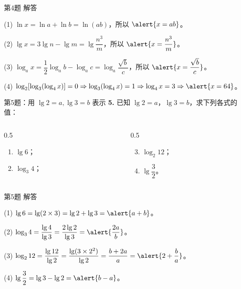 \documentclass[10pt,aspectratio=169,serif]{beamer}
\begin{document}
\begin{frame}[t]{第4题 解答}
\begin{tcolorbox}[colback=orange!10,colframe=orange,title=\textbf{解}]
(1) $\ln x = \ln a + \ln b = \ln(ab)$，所以 $\alert{x = ab}$。

(2) $\lg x = 3\lg n - \lg m = \lg\dfrac{n^3}{m}$，所以 $\alert{x = \dfrac{n^3}{m}}$。

(3) $\log_a x = \dfrac{1}{2}\log_a b - \log_a c = \log_a\dfrac{\sqrt{b}}{c}$，所以 $\alert{x = \dfrac{\sqrt{b}}{c}}$。

(4) $\log_2[\log_3(\log_4 x)] = 0 \Rightarrow \log_3(\log_4 x) = 1 \Rightarrow \log_4 x = 3 \Rightarrow \alert{x = 64}$。
\end{tcolorbox}
\end{frame}

\begin{frame}[t]{第5题：用 $\lg 2=a, \lg 3=b$ 表示}
\textbf{5.} 已知 $\lg 2 = a$，$\lg 3 = b$，求下列各式的值：

\vspace{0.5em}
\begin{columns}[t]
\begin{column}{0.5\textwidth}
\begin{enumerate}
  \item $\lg 6$；
  \item $\log_3 4$；
\end{enumerate}
\end{column}
\begin{column}{0.5\textwidth}
\begin{enumerate}\setcounter{enumi}{2}
  \item $\log_2 12$；
  \item $\lg\dfrac{3}{2}$。
\end{enumerate}
\end{column}
\end{columns}
\end{frame}

\begin{frame}[t]{第5题 解答}
\begin{tcolorbox}[colback=orange!10,colframe=orange,title=\textbf{解}]
(1) $\lg 6 = \lg(2\times 3) = \lg 2 + \lg 3 = \alert{a+b}$。

(2) $\log_3 4 = \dfrac{\lg 4}{\lg 3} = \dfrac{2\lg 2}{\lg 3} = \alert{\dfrac{2a}{b}}$。

(3) $\log_2 12 = \dfrac{\lg 12}{\lg 2} = \dfrac{\lg(3\times 2^2)}{\lg 2} = \dfrac{b+2a}{a} = \alert{2+\dfrac{b}{a}}$。

(4) $\lg\dfrac{3}{2} = \lg 3 - \lg 2 = \alert{b-a}$。
\end{tcolorbox}
\end{frame}
\end{document}
